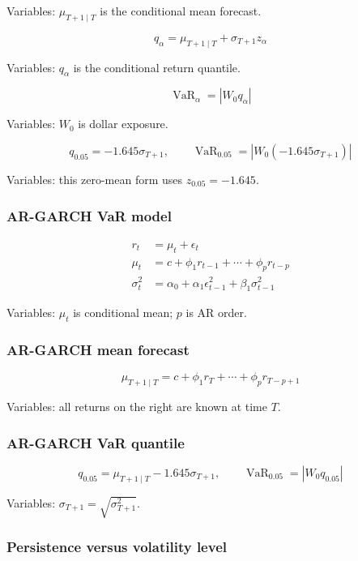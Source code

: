 \documentclass[
  8pt,
  twocolumn]{extarticle}
\begin{document}
Variables: \(\mu_{T+1\mid T}\) is the conditional mean forecast.

\[
q_\alpha=\mu_{T+1\mid T}+\sigma_{T+1}z_\alpha
\]

Variables: \(q_\alpha\) is the conditional return quantile.

\[
\operatorname{VaR}_\alpha=|W_0q_\alpha|
\]

Variables: \(W_0\) is dollar exposure.

\[
q_{0.05}=-1.645\sigma_{T+1},\qquad \operatorname{VaR}_{0.05}=|W_0(-1.645\sigma_{T+1})|
\]

Variables: this zero-mean form uses \(z_{0.05}=-1.645\).

\subsubsection{AR-GARCH VaR model}\label{ar-garch-var-model}

\[
\begin{aligned}
r_t&=\mu_t+\epsilon_t\\
\mu_t&=c+\phi_1r_{t-1}+\cdots+\phi_pr_{t-p}\\
\sigma_t^2&=\alpha_0+\alpha_1\epsilon_{t-1}^2+\beta_1\sigma_{t-1}^2
\end{aligned}
\]

Variables: \(\mu_t\) is conditional mean; \(p\) is AR order.

\subsubsection{AR-GARCH mean forecast}\label{ar-garch-mean-forecast}

\[
\mu_{T+1\mid T}=c+\phi_1r_T+\cdots+\phi_pr_{T-p+1}
\]

Variables: all returns on the right are known at time \(T\).

\subsubsection{AR-GARCH VaR quantile}\label{ar-garch-var-quantile}

\[
q_{0.05}=\mu_{T+1\mid T}-1.645\sigma_{T+1},\qquad \operatorname{VaR}_{0.05}=|W_0q_{0.05}|
\]

Variables: \(\sigma_{T+1}=\sqrt{\sigma_{T+1}^2}\).

\subsubsection{Persistence versus volatility
level}\label{persistence-versus-volatility-level}
\end{document}
